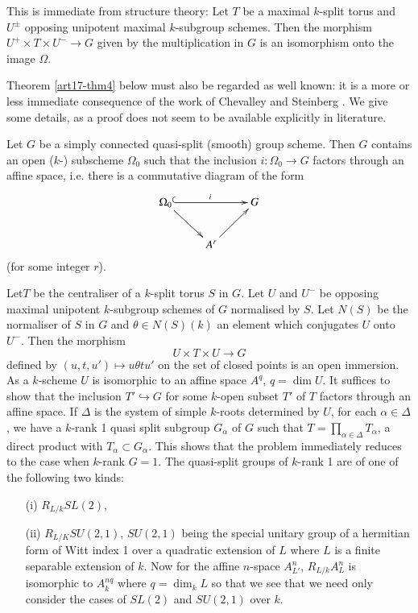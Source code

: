This is immediate from structure theory: Let $T$ be a maximal $k$-split torus and $U^{\pm}$ opposing unipotent maximal $k$-subgroup schemes. Then the morphism $U^+ \times T \times U^- \to G$ given by the multiplication in $G$ is an isomorphism onto the image $\Omega$.

Theorem \ref{art17-thm4} below must also be regarded as well known: it is a more or less immediate consequence of the work of Chevalley \cite{art17-key3} and Steinberg \cite{art17-key13}. We give some details, as a proof does not seem to be available explicitly in literature.


\begin{theorem}\label{art17-thm4}
Let $G$ be a simply connected quasi-split (smooth) group scheme. Then $G$ contains an open ($k$-) subscheme $\Omega_0$ such that the inclusion $i: \Omega_0 \to G$ factors through an affine space, i.e. there is a commutative diagram of the form
\[
\xymatrix{
\Omega_0 \ar@{^{(}->}[rr]^i  \ar[dr] & & G \\
& A^r \ar[ur] &
}
\]
(for some integer $r$).
\end{theorem}

Let\pageoriginale $T$ be the centraliser of a $k$-split torus $S$ in $G$. Let $U$ and $U^-$ be opposing maximal unipotent $k$-subgroup schemes of $G$ normalised by $S$. Let $N(S)$ be the normaliser of $S$ in $G$ and $\theta \in N(S)(k)$ an element which conjugates $U$ onto $U^-$. Then the morphism 
$$
U \times T \times U \to G
$$
defined by $(u, t, u') \mapsto u \theta tu'$ on the set of closed points is an open immersion. As a $k$-scheme $U$ is isomorphic to an affine space $A^q$, $q = \dim U$. It suffices to show that the inclusion $T' \hookrightarrow G$ for some $k$-open subset $T'$ of $T$ factors through an affine space. If $\Delta$ is the system of simple $k$-roots determined by $U$, for each $\alpha \in \Delta$, we have a $k$-rank 1 quasi split subgroup $G_\alpha$ of $G$ such that $T = \prod\limits_{\alpha \in \Delta} T_\alpha$, a direct product with $T_\alpha \subset G_\alpha$. This shows that the problem immediately reduces to the case when $k$-rank $G =1$. The quasi-split groups of $k$-rank 1 are of one of the following two kinds:
\begin{itemize}
\item[(i)] $R_{L/k} SL(2)$,

\item[(ii)] $R_{L/K} S U (2,1)$, $SU (2,1)$ being the special unitary group of a hermitian form of Witt index 1 over a quadratic extension of $L$ where $L$ is a finite separable extension of $k$. Now for the affine $n$-space $A^n_{L'}$, $R_{L/k} A^n_L$ is isomorphic to $A^{nq}_k$ where $q = \dim_k L$ so that we see that we need only consider the cases of $SL(2)$ and $SU(2,1)$ over $k$.
\end{itemize}


